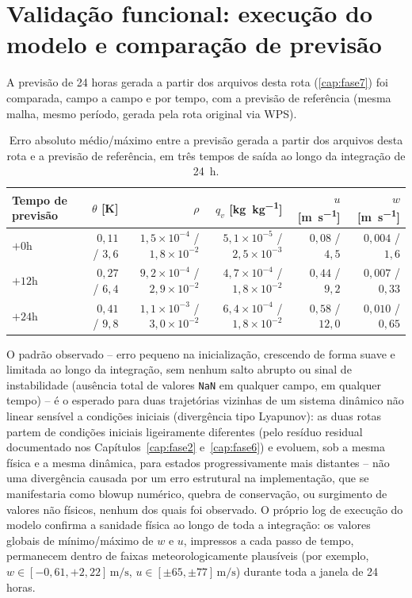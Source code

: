\section{Validação funcional: execução do modelo e comparação de previsão}

A previsão de 24 horas gerada a partir dos arquivos desta rota
(\cref{cap:fase7}) foi comparada, campo a campo e por tempo, com a
previsão de referência (mesma malha, mesmo período, gerada pela rota
original via WPS).

\begin{table}[H]
\centering
\caption{Erro absoluto médio/máximo entre a previsão gerada a partir dos
  arquivos desta rota e a previsão de referência, em três tempos de
  saída ao longo da integração de 24~h.}
\label{tab:validacao_previsao}
\begin{tabular}{@{}lrrrrr@{}}
\toprule
Tempo de previsão & $\theta$ [\si{\kelvin}] & $\rho$ & $q_v$ [\si{\kilo\gram\per\kilo\gram}] & $u$ [\si{\meter\per\second}] & $w$ [\si{\meter\per\second}] \\
\midrule
$+0$h  & $0{,}11$ / $3{,}6$ & $1{,}5\times10^{-4}$ / $1{,}8\times10^{-2}$ & $5{,}1\times10^{-5}$ / $2{,}5\times10^{-3}$ & $0{,}08$ / $4{,}5$ & $0{,}004$ / $1{,}6$ \\
$+12$h & $0{,}27$ / $6{,}4$ & $9{,}2\times10^{-4}$ / $2{,}9\times10^{-2}$ & $4{,}7\times10^{-4}$ / $1{,}8\times10^{-2}$ & $0{,}44$ / $9{,}2$ & $0{,}007$ / $0{,}33$ \\
$+24$h & $0{,}41$ / $9{,}8$ & $1{,}1\times10^{-3}$ / $3{,}0\times10^{-2}$ & $6{,}4\times10^{-4}$ / $1{,}8\times10^{-2}$ & $0{,}58$ / $12{,}0$ & $0{,}010$ / $0{,}65$ \\
\bottomrule
\end{tabular}
\end{table}

O padrão observado -- erro pequeno na inicialização, crescendo de forma
suave e limitada ao longo da integração, sem nenhum salto abrupto ou
sinal de instabilidade (ausência total de valores \texttt{NaN} em
qualquer campo, em qualquer tempo) -- é o esperado para duas trajetórias
vizinhas de um sistema dinâmico não linear sensível a condições iniciais
(divergência tipo Lyapunov): as duas rotas partem de condições iniciais
ligeiramente diferentes (pelo resíduo residual documentado nos
Capítulos~\ref{cap:fase2} e~\ref{cap:fase6}) e evoluem, sob a mesma
física e a mesma dinâmica, para estados progressivamente mais distantes
-- não uma divergência causada por um erro estrutural na implementação,
que se manifestaria como blowup numérico, quebra de conservação, ou
surgimento de valores não físicos, nenhum dos quais foi observado. O
próprio log de execução do modelo confirma a sanidade física ao longo de
toda a integração: os valores globais de mínimo/máximo de $w$ e $u$,
impressos a cada passo de tempo, permanecem dentro de faixas
meteorologicamente plausíveis (por exemplo, $w \in [-0{,}61,
+2{,}22]\,\si{\meter\per\second}$, $u \in [\pm 65, \pm 77]\,\si{\meter\per\second}$)
durante toda a janela de 24 horas.
